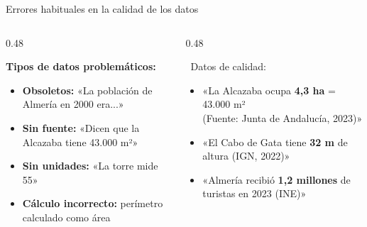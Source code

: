 \documentclass[aspectratio=169, 10pt, spanish]{beamer}
\begin{document}
\begin{frame}{Errores habituales en la calidad de los datos}
  \begin{columns}[t]
    \begin{column}{0.48\textwidth}
      \begin{errorbox}
        \textbf{Tipos de datos problemáticos:}
        \begin{itemize}
          \item[\incorrecto] \textbf{Obsoletos:} «La población de Almería en 2000 era...»
          \item[\incorrecto] \textbf{Sin fuente:} «Dicen que la Alcazaba tiene 43.000 m²»
          \item[\incorrecto] \textbf{Sin unidades:} «La torre mide 55»
          \item[\incorrecto] \textbf{Cálculo incorrecto:} perímetro calculado como área
        \end{itemize}
      \end{errorbox}
    \end{column}
    \begin{column}{0.48\textwidth}
      \begin{exampleblock}{\correcto\ Datos de calidad:}
        \begin{itemize}
          \item «La Alcazaba ocupa \textbf{4,3 ha} = 43.000 m²\\ (Fuente: Junta de Andalucía, 2023)»
          \item «El Cabo de Gata tiene \textbf{32 m} de altura (IGN, 2022)»
          \item «Almería recibió \textbf{1,2 millones} de turistas en 2023 (INE)»
        \end{itemize}
      \end{exampleblock}
    \end{column}
  \end{columns}
\end{frame}
\end{document}
